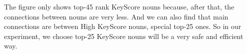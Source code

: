 The figure only shows top-45 rank KeyScore nouns because, after that, the connections between nouns are very less. And we can also find that main connections are between High KeyScore nouns, special top-25 ones. So in our experiment, we choose top-25 KeyScore nouns will be a very safe and efficient way.